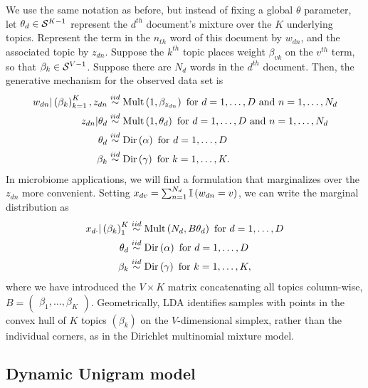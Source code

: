 \documentclass{article}
\begin{document}
We use the same notation as before, but instead of fixing a global $\theta$
parameter, let $\theta_{d} \in \mathcal{S}^{K - 1}$ represent the $d^{th}$
document's mixture over the $K$ underlying topics. Represent the term in the
$n_{th}$ word of this document by $w_{dn}$, and the associated topic by
$z_{dn}$. Suppose the $k^{th}$ topic places weight $\beta_{vk}$ on the $v^{th}$
term, so that $\beta_{k} \in \mathcal{S}^{V - 1}$. Suppose there are $N_{d}$ words
in the $d^{th}$ document. Then, the generative mechanism for the observed data
set is
\begin{align*}
w_{dn} \vert \left(\beta_{k}\right)_{k = 1}^{K}, z_{dn} &\overset{iid}{\sim} \textnormal{Mult}\left(1, \beta_{z_{dn}}\right) \text{ for } d = 1, \dots, D  \text{ and } n = 1, \dots,  N_{d} \\
z_{dn} \vert \theta_{d} &\overset{iid}{\sim} \textnormal{Mult}\left(1, \theta_{d}\right) \text{ for } d = 1, \dots, D \text{ and } n = 1, \dots, N_{d}\\
\theta_{d} &\overset{iid}{\sim} \textnormal{Dir}\left(\alpha\right) \text{ for } d = 1, \dots, D \\
\beta_{k} &\overset{iid}{\sim} \textnormal{Dir}\left(\gamma\right) \text{ for } k = 1, \dots, K.
\end{align*}
In microbiome applications, we will find a formulation that marginalizes over
the $z_{dn}$ more convenient. Setting $x_{dv} = \sum_{n = 1}^{N_{d}}
\mathbb{I}\left({w_{dn} = v}\right)$, we can write the marginal distribution as
\begin{align*}
x_{d\cdot} \vert \left(\beta_{k}\right)_{1}^{K} &\overset{iid}{\sim} \textnormal{Mult}\left(N_{d}, B\theta_{d}\right) \text{ for } d = 1, \dots, D\\
\theta_{d} &\overset{iid}{\sim} \textnormal{Dir}\left(\alpha\right) \text{ for } d = 1, \dots, D \\
\beta_{k} &\overset{iid}{\sim} \textnormal{Dir}\left(\gamma\right) \text{ for }k = 1, \dots, K,
\end{align*}
where we have introduced the $V \times K$ matrix concatenating all topics
column-wise, $B = \begin{pmatrix}\beta_{1}, \dots, \beta_{K}\end{pmatrix}$.
Geometrically, LDA identifies samples with points in the convex hull of $K$
topics $\left(\beta_{k}\right)$ on the $V$-dimensional simplex, rather than the
individual corners, as in the Dirichlet multinomial mixture model.

\subsection{Dynamic Unigram model}
\end{document}
